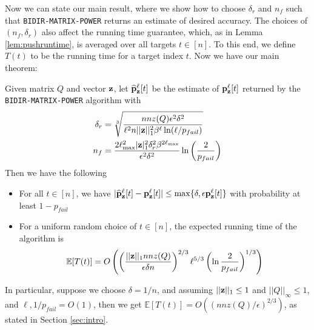 Now we can state our main result, where we show how to choose $\delta_r$ and $n_f$ such that \texttt{BIDIR-MATRIX-POWER} returns an estimate of desired accuracy. 
The choices of $(n_f,\delta_r)$ also affect the running time guarantee, which, as in Lemma \ref{lem:pushruntime}, is averaged over all targets $t\in[n]$. 
To this end, we define $T(t)$ to be the running time for a target index $t$. 
Now we have our main theorem:
\begin{theorem}
\label{thm:main}
Given matrix $Q$ and vector $\mathbf{z}$, let $\widehat{\mathbf{p}}_\mathbf{z}^{\ell}[t]$ be the estimate of ${\mathbf{p}}_\mathbf{z}^{\ell}[t]$ returned by the \texttt{BIDIR-MATRIX-POWER} algorithm with 
\begin{align*}
\delta_r &= \sqrt[3]{\frac{nnz(Q) \epsilon^2\delta^2}{\ell^2 n||\mathbf{z}||_1^2\beta^{\ell}\ln(\ell/p_{fail}) } }\\
n_f &= \frac{2 \ell_{\max}^2|\mathbf{z}|_1^2 \delta_r^2 \beta^{2\ell_{\max}}}{\epsilon^2\delta^2}\ln \left(\frac{2}{p_{fail}}\right)
\end{align*}
Then we have the following
\begin{itemize}
\item For all $t\in[n]$, we have $|\widehat{\mathbf{p}}_\mathbf{z}^{\ell}[t]-{\mathbf{p}}_\mathbf{z}^{\ell}[t]|\leq \max\{\delta,\epsilon{\mathbf{p}}_\mathbf{z}^{\ell}[t]\}$ with probability at least $1-p_{fail}$ 
\item For a uniform random choice of $t\in[n]$, the expected running time of the algorithm is
$$
\mathbb{E}[T(t)] = O\left( \left(\frac{||\mathbf{z}||_1 nnz(Q)}{\epsilon \delta n} \right)^{2/3} \ell^{5/3}\left(\ln \frac{2}{p_{fail}} \right)^{1/3} \right)$$
\end{itemize}
\end{theorem}

In particular, suppose we choose $\delta = 1/n$, and assuming $||\mathbf{z}||_1\leq 1$ and $||Q||_{\infty}\leq 1$, and $\ell,1/p_{fail}=O(1)$, then we get $\mathbb{E}[T(t)] = O\left(\left(nnz(Q)/\epsilon\right)^{2/3}\right)$, as stated in Section \ref{sec:intro}.

